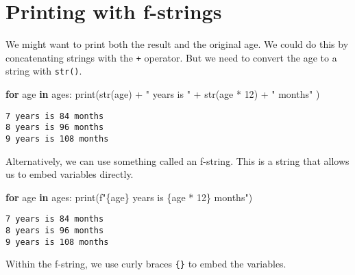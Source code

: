 \documentclass[
  letterpaper,
  DIV=11,
  numbers=noendperiod]{scrreprt}
\newenvironment{Shaded}{\begin{snugshade}}{\end{snugshade}}
\newcommand{\BuiltInTok}[1]{\textcolor[rgb]{0.00,0.23,0.31}{#1}}
\newcommand{\ControlFlowTok}[1]{\textcolor[rgb]{0.00,0.23,0.31}{\textbf{#1}}}
\newcommand{\DecValTok}[1]{\textcolor[rgb]{0.68,0.00,0.00}{#1}}
\newcommand{\KeywordTok}[1]{\textcolor[rgb]{0.00,0.23,0.31}{\textbf{#1}}}
\newcommand{\NormalTok}[1]{\textcolor[rgb]{0.00,0.23,0.31}{#1}}
\newcommand{\OperatorTok}[1]{\textcolor[rgb]{0.37,0.37,0.37}{#1}}
\newcommand{\SpecialCharTok}[1]{\textcolor[rgb]{0.37,0.37,0.37}{#1}}
\newcommand{\SpecialStringTok}[1]{\textcolor[rgb]{0.13,0.47,0.30}{#1}}
\newcommand{\StringTok}[1]{\textcolor[rgb]{0.13,0.47,0.30}{#1}}
\begin{document}
\section{Printing with f-strings}\label{printing-with-f-strings}

We might want to print both the result and the original age. We could do
this by concatenating strings with the \texttt{+} operator. But we need
to convert the age to a string with \texttt{str()}.

\begin{Shaded}
\begin{Highlighting}[]
\ControlFlowTok{for}\NormalTok{ age }\KeywordTok{in}\NormalTok{ ages:}
    \BuiltInTok{print}\NormalTok{(}\BuiltInTok{str}\NormalTok{(age) }\OperatorTok{+} \StringTok{" years is "} \OperatorTok{+} \BuiltInTok{str}\NormalTok{(age }\OperatorTok{*} \DecValTok{12}\NormalTok{) }\OperatorTok{+} \StringTok{" months"}\NormalTok{ )}
\end{Highlighting}
\end{Shaded}

\begin{verbatim}
7 years is 84 months
8 years is 96 months
9 years is 108 months
\end{verbatim}

Alternatively, we can use something called an f-string. This is a string
that allows us to embed variables directly.

\begin{Shaded}
\begin{Highlighting}[]
\ControlFlowTok{for}\NormalTok{ age }\KeywordTok{in}\NormalTok{ ages:}
    \BuiltInTok{print}\NormalTok{(}\SpecialStringTok{f"}\SpecialCharTok{\{}\NormalTok{age}\SpecialCharTok{\}}\SpecialStringTok{ years is }\SpecialCharTok{\{}\NormalTok{age }\OperatorTok{*} \DecValTok{12}\SpecialCharTok{\}}\SpecialStringTok{ months"}\NormalTok{)}
\end{Highlighting}
\end{Shaded}

\begin{verbatim}
7 years is 84 months
8 years is 96 months
9 years is 108 months
\end{verbatim}

Within the f-string, we use curly braces \texttt{\{\}} to embed the
variables.
\end{document}

